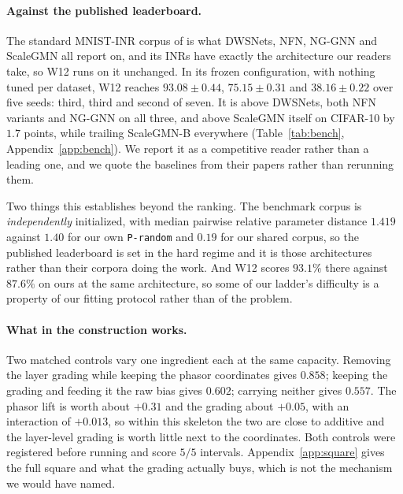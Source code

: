 \paragraph{Against the published leaderboard.} The standard MNIST-INR corpus of
\citet{navon2023dws} is what DWSNets, NFN, NG-GNN and ScaleGMN all report on, and its INRs have
exactly the architecture our readers take, so W12 runs on it unchanged. In its frozen
configuration, with nothing tuned per dataset, W12 reaches $93.08 \pm 0.44$, $75.15 \pm 0.31$ and
$38.16 \pm 0.22$ over five seeds: third, third and second of seven. It is above DWSNets, both NFN
variants and NG-GNN on all three, and above ScaleGMN itself on CIFAR-10 by $1.7$ points, while
trailing ScaleGMN-B everywhere (Table~\ref{tab:bench}, Appendix~\ref{app:bench}). We report it
as a competitive reader rather than a leading one, and we quote the baselines from their papers
rather than rerunning them.

\noindent Two things this establishes beyond the ranking. The benchmark corpus is
\emph{independently} initialized, with median pairwise relative parameter distance $1.419$ against
$1.40$ for our own \texttt{P-random} and $0.19$ for our shared corpus, so the published leaderboard
is set in the hard regime and it is those architectures rather than their corpora doing the work.
And W12 scores $93.1\%$ there against $87.6\%$ on ours at the same architecture, so some of our
ladder's difficulty is a property of our fitting protocol rather than of the problem.

\paragraph{What in the construction works.} Two matched controls vary one ingredient each at the
same capacity. Removing the layer grading while keeping the phasor coordinates gives $0.858$;
keeping the grading and feeding it the raw bias gives $0.602$; carrying neither gives $0.557$. The
phasor lift is worth about $+0.31$ and the grading about $+0.05$, with an interaction of $+0.013$,
so within this skeleton the two are close to additive and the layer-level grading is worth little
next to the coordinates. Both controls were registered before running and score $5/5$ intervals.
Appendix~\ref{app:square} gives the full square and what the grading actually buys, which is not
the mechanism we would have named.
